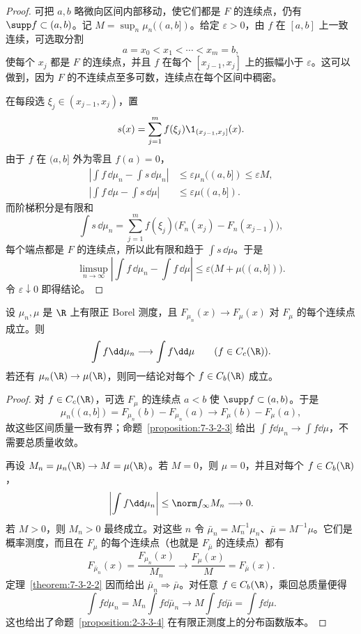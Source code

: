\begin{proof}
可把 $a,b$ 略微向区间内部移动，使它们都是 $F$ 的连续点，仍有
$\supp f\subset(a,b)$。记
$M=\sup_n\mu_n((a,b])$。给定 $\varepsilon>0$，由 $f$ 在 $[a,b]$ 上一致连续，可选取分割
\[
 a=x_0<x_1<\cdots<x_m=b,
\]
使每个 $x_j$ 都是 $F$ 的连续点，并且 $f$ 在每个 $[x_{j-1},x_j]$ 上的振幅小于
$\varepsilon$。这可以做到，因为 $F$ 的不连续点至多可数，连续点在每个区间中稠密。

在每段选 $\xi_j\in(x_{j-1},x_j)$，置
\[
 s(x)=\sum_{j=1}^mf(\xi_j)\1_{(x_{j-1},x_j]}(x).
\]
由于 $f$ 在 $(a,b]$ 外为零且 $f(a)=0$，
\begin{align*}
 \left|\int f\,\dd\mu_n-\int s\,\dd\mu_n\right|
 &\leq\varepsilon\mu_n((a,b])\leq\varepsilon M,\\
 \left|\int f\,\dd\mu-\int s\,\dd\mu\right|
 &\leq\varepsilon\mu((a,b]).
\end{align*}
而阶梯积分是有限和
\[
 \int s\,\dd\mu_n
 =\sum_{j=1}^mf(\xi_j)
   \bigl(F_n(x_j)-F_n(x_{j-1})\bigr),
\]
每个端点都是 $F$ 的连续点，所以此有限和趋于
$\int s\,\dd\mu$。于是
\[
 \limsup_{n\to\infty}
 \left|\int f\,\dd\mu_n-\int f\,\dd\mu\right|
 \leq\varepsilon\bigl(M+\mu((a,b])\bigr).
\]
令 $\varepsilon\downarrow0$ 即得结论。
\end{proof}

\begin{corollary}[有限正测度的分布函数判据]\label{corollary:7-3-2-finite-measures}
设 $\mu_n,\mu$ 是 $\R$ 上有限正 Borel 测度，且
$F_{\mu_n}(x)\to F_\mu(x)$ 对 $F_\mu$ 的每个连续点成立。则
\[
 \int f\dd\mu_n\longrightarrow\int f\dd\mu
 \qquad(f\in C_c(\R)).
\]
若还有 $\mu_n(\R)\to\mu(\R)$，则同一结论对每个 $f\in C_b(\R)$ 成立。
\end{corollary}

\begin{proof}
对 $f\in C_c(\R)$，可选 $F_\mu$ 的连续点 $a<b$ 使 $\supp f\subset(a,b)$。于是
\[
 \mu_n((a,b])=F_{\mu_n}(b)-F_{\mu_n}(a)
 \longrightarrow F_\mu(b)-F_\mu(a),
\]
故这些区间质量一致有界；命题~\ref{proposition:7-3-2-3} 给出
$\int f\dd\mu_n\to\int f\dd\mu$，不需要总质量收敛。

再设 $M_n=\mu_n(\R)\to M=\mu(\R)$。若 $M=0$，则 $\mu=0$，并且对每个
$f\in C_b(\R)$，
\[
 \left|\int f\dd\mu_n\right|\leq\norm f_\infty M_n\longrightarrow0.
\]
若 $M>0$，则 $M_n>0$ 最终成立。对这些 $n$ 令
$\bar\mu_n=M_n^{-1}\mu_n$、$\bar\mu=M^{-1}\mu$。它们是概率测度，而且在
$F_\mu$ 的每个连续点（也就是 $F_{\bar\mu}$ 的连续点）都有
\[
 F_{\bar\mu_n}(x)=\frac{F_{\mu_n}(x)}{M_n}\longrightarrow
 \frac{F_\mu(x)}M=F_{\bar\mu}(x).
\]
定理~\ref{theorem:7-3-2-2} 因而给出 $\bar\mu_n\Rightarrow\bar\mu$。对任意
$f\in C_b(\R)$，乘回总质量便得
\[
 \int f\dd\mu_n=M_n\int f\dd\bar\mu_n
 \longrightarrow M\int f\dd\bar\mu=\int f\dd\mu.
\]
这也给出了命题~\ref{proposition:2-3-3-4} 在有限正测度上的分布函数版本。
\end{proof}

